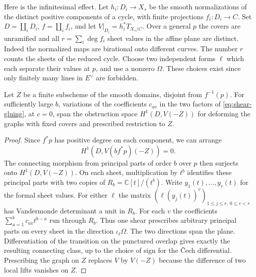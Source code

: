 Here is the infinitesimal effect. Let
$h_i:D_i\to X_s$ be the smooth normalizations of the distinct
positive components of a cycle, with finite projections
$f_i:D_i\to C$. Set $D=\coprod_iD_i$, $f=\coprod_i f_i$, and let
$V|_{D_i}=h_i^*T_{X_s/C}$. Over a general $p$ the covers are
unramified and all $r=\sum_i\deg f_i$ sheet values in the affine
plane are distinct. Indeed the normalized maps are birational onto
different curves. The number $r$ counts the sheets of the reduced
cycle. Choose two independent forms $\ell$ which each separate their
values at $p$, and use a nonzero $\Omega$. These choices exist since
only finitely many lines in $E^\vee$ are forbidden.

\begin{lemma}\label{lem:shear-jets}
Let $Z$ be a finite subscheme of the smooth domains, disjoint from
$f^{-1}(p)$. For sufficiently large $b$, variations of the
coefficients $c_{av}$ in the two factors of \eqref{eq:shear-gluing},
at $c=0$, span the obstruction space $H^1(D,V(-Z))$ for deforming
the graphs with fixed covers and prescribed restriction to $Z$.
\end{lemma}

\begin{proof}
Since $f^*p$ has positive degree on each component, we can arrange
\[
 H^1(D,V(bf^*p)(-Z))=0 .
\]
The connecting morphism from
principal parts of order $b$ over $p$ then surjects onto
$H^1(D,V(-Z))$. On each sheet, multiplication by $t^b$ identifies
these principal parts with two copies of
$R_b=\mathbb C[t]/(t^b)$. Write $y_1(t),\ldots,y_r(t)$ for the
formal sheet values. For either $\ell$ the matrix
$(\ell(y_j(t))^v)_{1\le j\le r,\ 0\le v<r}$ has Vandermonde
determinant a unit in $R_b$. For each $v$ the coefficients
$\sum_{a=1}^b c_{av}t^{b-a}$ run through $R_b$. Thus one shear
prescribes arbitrary principal parts on every sheet in the direction
$\iota_\ell\Omega$. The two directions span the plane. Differentiation
of the transition on the punctured overlap gives exactly the resulting
connecting class, up to the choice of sign for the \v Cech
differential. Prescribing the graph on $Z$ replaces $V$ by $V(-Z)$
because the difference of two local lifts vanishes on $Z$.
\end{proof}


